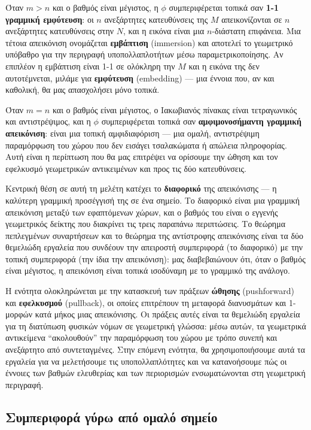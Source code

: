 \documentclass[11pt,a4paper,twoside,openright]{book}
\begin{document}
Όταν $m > n$ και ο βαθμός είναι μέγιστος, η $\phi$ συμπεριφέρεται τοπικά σαν \textbf{1-1 γραμμική εμφύτευση}: οι $n$ ανεξάρτητες κατευθύνσεις της $M$ απεικονίζονται σε $n$ ανεξάρτητες κατευθύνσεις στην $N$, και η εικόνα είναι μια $n$-διάστατη επιφάνεια. Μια τέτοια απεικόνιση ονομάζεται \textbf{εμβάπτιση} (immersion) και αποτελεί το γεωμετρικό υπόβαθρο για την περιγραφή υποπολλαπλοτήτων μέσω παραμετρικοποίησης. Αν επιπλέον η εμβάπτιση είναι 1-1 σε ολόκληρη την $M$ και η εικόνα της δεν αυτοτέμνεται, μιλάμε για \textbf{εμφύτευση} (embedding) --- μια έννοια που, αν και καθολική, θα μας απασχολήσει μόνο τοπικά.

Όταν $m = n$ και ο βαθμός είναι μέγιστος, ο Ιακωβιανός πίνακας είναι τετραγωνικός και αντιστρέψιμος, και η $\phi$ συμπεριφέρεται τοπικά σαν \textbf{αμφιμονοσήμαντη γραμμική απεικόνιση}: είναι μια τοπική αμφιδιαφόριση --- μια ομαλή, αντιστρέψιμη παραμόρφωση του χώρου που δεν εισάγει τσαλακώματα ή απώλεια πληροφορίας. Αυτή είναι η περίπτωση που θα μας επιτρέψει να ορίσουμε την ώθηση και τον εφελκυσμό γεωμετρικών αντικειμένων και προς τις δύο κατευθύνσεις.

Κεντρική θέση σε αυτή τη μελέτη κατέχει το \textbf{διαφορικό} της απεικόνισης --- η καλύτερη γραμμική προσέγγισή της σε ένα σημείο. Το διαφορικό είναι μια γραμμική απεικόνιση μεταξύ των εφαπτόμενων χώρων, και ο βαθμός του είναι ο εγγενής γεωμετρικός δείκτης που διακρίνει τις τρεις παραπάνω περιπτώσεις. Το θεώρημα πεπλεγμένων συναρτήσεων και το θεώρημα της αντίστροφης απεικόνισης είναι τα δύο θεμελιώδη εργαλεία που συνδέουν την απειροστή συμπεριφορά (το διαφορικό) με την τοπική συμπεριφορά (την ίδια την απεικόνιση): μας διαβεβαιώνουν ότι, όταν ο βαθμός είναι μέγιστος, η απεικόνιση είναι τοπικά ισοδύναμη με το γραμμικό της ανάλογο.

Η ενότητα ολοκληρώνεται με την κατασκευή των πράξεων \textbf{ώθησης} (pushforward) και \textbf{εφελκυσμού} (pullback), οι οποίες επιτρέπουν τη μεταφορά διανυσμάτων και 1-μορφών κατά μήκος μιας απεικόνισης. Οι πράξεις αυτές είναι τα θεμελιώδη εργαλεία για τη διατύπωση φυσικών νόμων σε γεωμετρική γλώσσα: μέσω αυτών, τα γεωμετρικά αντικείμενα ``ακολουθούν'' την παραμόρφωση του χώρου με τρόπο συνεπή και ανεξάρτητο από συντεταγμένες. Στην επόμενη ενότητα, θα χρησιμοποιήσουμε αυτά τα εργαλεία για να μελετήσουμε τις υποπολλαπλότητες και να κατανοήσουμε πώς οι έννοιες των βαθμών ελευθερίας και των περιορισμών ενσωματώνονται στη γεωμετρική περιγραφή.

\subsection{Συμπεριφορά γύρω από ομαλό σημείο}
\end{document}
